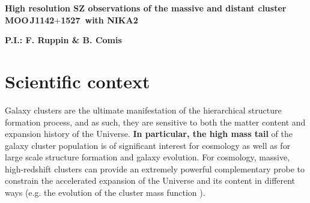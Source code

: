 \documentclass[11pt,a4paper,twoside,graphicx,color]{article}
\begin{document}
\def\moo{MOO\,J1142$+$1527}
%
%
\begin{center}{\huge \bf
High resolution SZ observations of the massive and distant cluster \moo\ with NIKA2
}\end{center}
% 
\centerline{\bf P.I.: F. Ruppin \& B. Comis}

\section{Scientific context}
Galaxy clusters are the ultimate manifestation of the hierarchical structure formation process, and as such, they are sensitive to both the matter content and expansion history of the Universe. %
\textbf{In particular, the high mass tail} of the galaxy cluster population is of significant interest for cosmology as well as for large scale structure formation and galaxy evolution. For cosmology, massive, high-redshift clusters can provide an extremely powerful complementary probe to constrain the accelerated expansion of the Universe and its content in different ways (e.g. the evolution of the cluster mass function \cite{vik09}).%
\end{document}
